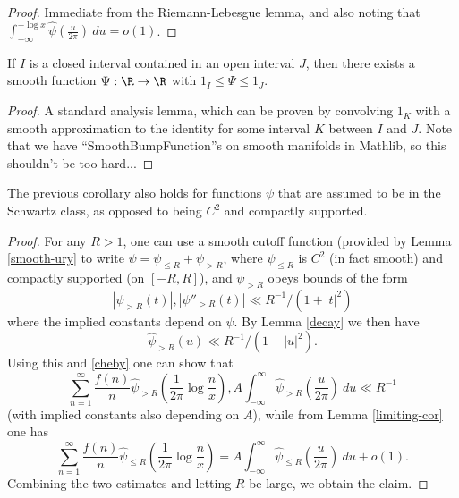 \begin{proof}
 Immediate from the Riemann-Lebesgue lemma, and also noting that $\int_{-\infty}^{-\log x} \hat \psi(\frac{u}{2\pi})\ du = o(1)$.
\end{proof}


\begin{lemma}\label{smooth-ury}\leanok  If $I$ is a closed interval contained in an open interval $J$, then there exists a smooth function $\Psi: \R \to \R$ with $1_I \leq \Psi \leq 1_J$.
\end{lemma}


\begin{proof}  \leanok
A standard analysis lemma, which can be proven by convolving $1_K$ with a smooth approximation to the identity for some interval $K$ between $I$ and $J$. Note that we have ``SmoothBumpFunction''s on smooth manifolds in Mathlib, so this shouldn't be too hard...
\end{proof}


\begin{lemma}\label{schwarz-id}\leanok  The previous corollary also holds for functions $\psi$ that are assumed to be in the Schwartz class, as opposed to being $C^2$ and compactly supported.
\end{lemma}


\begin{proof}
For any $R>1$, one can use a smooth cutoff function (provided by Lemma \ref{smooth-ury} to write $\psi = \psi_{\leq R} + \psi_{>R}$, where $\psi_{\leq R}$ is $C^2$ (in fact smooth) and compactly supported (on $[-R,R]$), and $\psi_{>R}$ obeys bounds of the form
$$ |\psi_{>R}(t)|, |\psi''_{>R}(t)| \ll R^{-1} / (1 + |t|^2) $$
where the implied constants depend on $\psi$.  By Lemma \ref{decay} we then have
$$ \hat \psi_{>R}(u) \ll R^{-1} / (1+|u|^2).$$
Using this and \eqref{cheby} one can show that
$$ \sum_{n=1}^\infty \frac{f(n)}{n} \hat \psi_{>R}( \frac{1}{2\pi} \log \frac{n}{x} ), A \int_{-\infty}^\infty \hat \psi_{>R} (\frac{u}{2\pi})\ du \ll R^{-1} $$
(with implied constants also depending on $A$), while from Lemma \ref{limiting-cor} one has
$$ \sum_{n=1}^\infty \frac{f(n)}{n} \hat \psi_{\leq R}( \frac{1}{2\pi} \log \frac{n}{x} ) = A \int_{-\infty}^\infty \hat \psi_{\leq R} (\frac{u}{2\pi})\ du + o(1).$$
Combining the two estimates and letting $R$ be large, we obtain the claim.
\end{proof}



